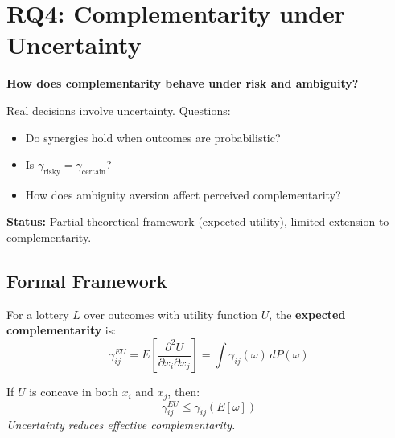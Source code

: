 \section{RQ4: Complementarity under Uncertainty}
\label{sec:rq4-uncertainty}

\begin{tcolorbox}[colback=red!5!white,colframe=red!75!black,title=\textbf{Research Question 4}]
\textbf{How does complementarity behave under risk and ambiguity?}

Real decisions involve uncertainty. Questions:
\begin{itemize}[noitemsep]
    \item Do synergies hold when outcomes are probabilistic?
    \item Is $\gamma_{\text{risky}} = \gamma_{\text{certain}}$?
    \item How does ambiguity aversion affect perceived complementarity?
\end{itemize}

\textbf{Status:} Partial theoretical framework (expected utility), limited extension to complementarity.
\end{tcolorbox}

\subsection{Formal Framework}

\begin{definition}
For a lottery $L$ over outcomes with utility function $U$, the \textbf{expected complementarity} is:
\begin{equation}
\gamma_{ij}^{EU} = E\left[ \frac{\partial^2 U}{\partial x_i \partial x_j} \right] = \int \gamma_{ij}(\omega) \, dP(\omega)
\label{eq:expected-gamma}
\end{equation}
\end{definition}

\begin{theorem}
If $U$ is concave in both $x_i$ and $x_j$, then:
\begin{equation}
\gamma_{ij}^{EU} \leq \gamma_{ij}(E[\omega])
\end{equation}
\textit{Uncertainty reduces effective complementarity.}
\end{theorem}

